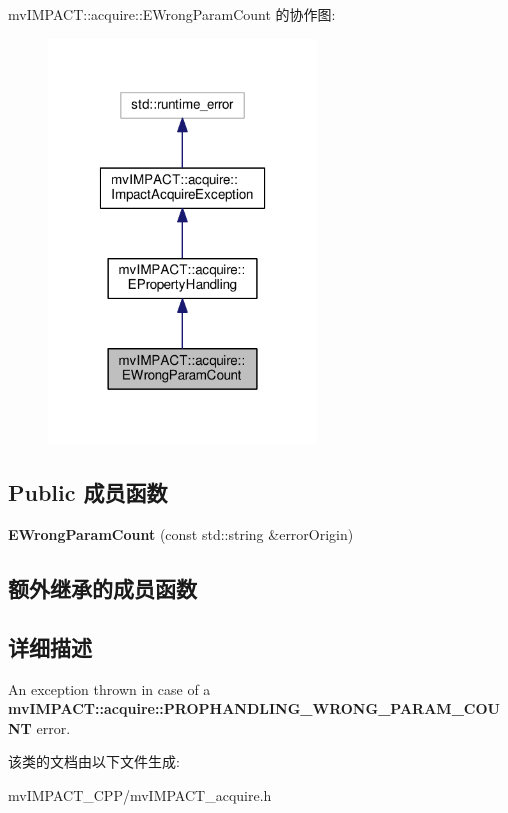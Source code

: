 mv\+I\+M\+P\+A\+C\+T\+:\+:acquire\+:\+:E\+Wrong\+Param\+Count 的协作图\+:
\nopagebreak
\begin{figure}[H]
\begin{center}
\leavevmode
\includegraphics[width=202pt]{classmv_i_m_p_a_c_t_1_1acquire_1_1_e_wrong_param_count__coll__graph}
\end{center}
\end{figure}
\subsection*{Public 成员函数}
\begin{DoxyCompactItemize}
\item 
\hypertarget{classmv_i_m_p_a_c_t_1_1acquire_1_1_e_wrong_param_count_abdbd7446503ac6c33dccb644757c12b3}{{\bfseries E\+Wrong\+Param\+Count} (const std\+::string \&error\+Origin)}\label{classmv_i_m_p_a_c_t_1_1acquire_1_1_e_wrong_param_count_abdbd7446503ac6c33dccb644757c12b3}

\end{DoxyCompactItemize}
\subsection*{额外继承的成员函数}


\subsection{详细描述}
An exception thrown in case of a {\bfseries mv\+I\+M\+P\+A\+C\+T\+::acquire\+::\+P\+R\+O\+P\+H\+A\+N\+D\+L\+I\+N\+G\+\_\+\+W\+R\+O\+N\+G\+\_\+\+P\+A\+R\+A\+M\+\_\+\+C\+O\+U\+N\+T} error. 

该类的文档由以下文件生成\+:\begin{DoxyCompactItemize}
\item 
mv\+I\+M\+P\+A\+C\+T\+\_\+\+C\+P\+P/mv\+I\+M\+P\+A\+C\+T\+\_\+acquire.\+h\end{DoxyCompactItemize}
